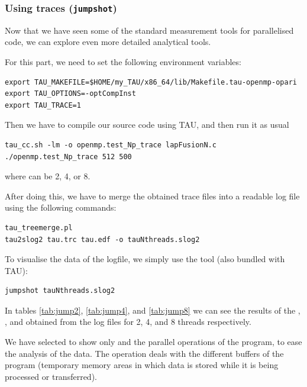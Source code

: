 \subsubsection{Using traces (\texttt{jumpshot})}

Now that we have seen some of the standard measurement tools for parallelised code, we can explore even more detailed analytical tools.

For this part, we need to set the following environment variables:
\begin{lstlisting}
export TAU_MAKEFILE=$HOME/my_TAU/x86_64/lib/Makefile.tau-openmp-opari
export TAU_OPTIONS=-optCompInst
export TAU_TRACE=1
\end{lstlisting}

Then we have to compile our source code using TAU, and then run it as usual
\begin{lstlisting}
tau_cc.sh -lm -o openmp.test_Np_trace lapFusionN.c
./openmp.test_Np_trace 512 500
\end{lstlisting}
where  can be 2, 4, or 8.

After doing this, we have to merge the obtained  trace files into a readable  log file using the following commands:
\begin{lstlisting}
tau_treemerge.pl
tau2slog2 tau.trc tau.edf -o tauNthreads.slog2
\end{lstlisting}

To visualise the data of the logfile, we simply use the  tool (also bundled with TAU):
\begin{lstlisting}
jumpshot tauNthreads.slog2
\end{lstlisting}

\bigskip
In tables \ref{tab:jump2}, \ref{tab:jump4}, and \ref{tab:jump8} we can see the results of the , , and  obtained from the  log files for 2, 4, and 8 threads respectively.

We have selected to show only  and the parallel operations of the program, to ease the analysis of the data. The  operation deals with the different buffers of the program (temporary memory areas in which data is stored while it is being processed or transferred).

